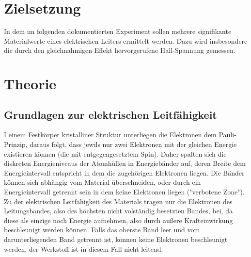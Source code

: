\section{Zielsetzung}
In dem im folgenden dokumentierten Experiment sollen mehrere signifikante Materialwerte eines elektrischen Leiters ermittelt werden. Dazu wird insbesondere die durch den gleichnahmigen Effekt hervorgerufene Hall-Spannung gemessen.
\section{Theorie}
\subsection{Grundlagen zur elektrischen Leitfähigkeit}
I einem Festkörper kristalliner Struktur unterliegen die Elektronen dem Pauli-Prinzip, daraus folgt, dass jewils nur zwei Elektronen mit der gleichen Energie existieren können (die mit entgegengesetztem Spin). Daher spalten sich die diskreten Energieniveaus der Atomhüllen in Energiebänder auf, deren Breite dem Energieintervall entspricht in dem die zugehörigen Elektronen liegen. Die Bänder können sich abhängig vom Material überschneiden, oder durch ein Energieintervall getrennt sein in dem keine Elektronen liegen ("verbotene Zone"). Zu der elektrischen Leitfähigkeit des Materials tragen nur die Elektronen des Leitungsbandes, also des höchsten nicht volständig besetzten Bandes, bei, da diese als einzige noch Energie aufnehmen, also durch äußere Krafteinwirkung beschleunigt werden können. Falls das oberste Band leer und vom darunterliegenden Band getrennt ist, können keine Elektronen beschleunigt werden, der Werkstoff ist in diesem Fall nicht leitend.

